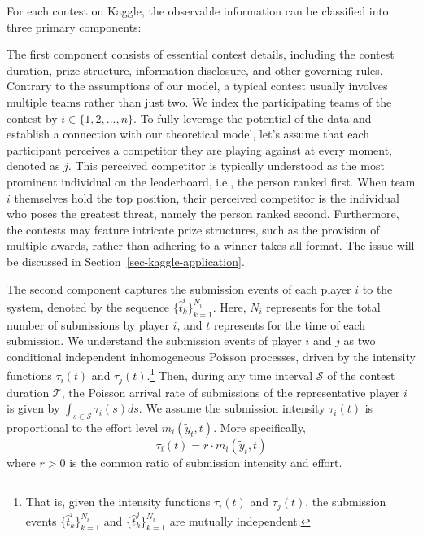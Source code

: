 \documentclass[mnsc]{informs3}
\begin{document}
For each contest on Kaggle, the observable information can be classified into three primary components: 

The first component consists of essential contest details, including the contest duration, prize structure, information disclosure, and other governing rules.
Contrary to the assumptions of our model, a typical contest usually involves multiple teams rather than just two.
We index the participating teams of the contest by $i\in\{1, 2, ..., n\}$. 
To fully leverage the potential of the data and establish a connection with our theoretical model, let's assume that each participant perceives a competitor they are playing against at every moment, denoted as $j$. 
This perceived competitor is typically understood as the most prominent individual on the leaderboard, i.e., the person ranked first.
When team $i$ themselves hold the top position, their perceived competitor is the individual who poses the greatest threat, namely the person ranked second.
Furthermore, the contests may feature intricate prize structures, such as the provision of multiple awards, rather than adhering to a winner-takes-all format.
The issue will be discussed in Section~\ref{sec-kaggle-application}. 

The second component captures the submission events of each player $i$ to the system, denoted by the sequence $\{\hat{t}^i_k\}_{k=1}^{N_i}$.
Here, $N_i$ represents for the total number of submissions by player $i$, and $t$ represents for the time of each submission. 
We understand the submission events of player $i$ and $j$ as two conditional independent inhomogeneous Poisson processes, driven by the intensity functions $\tau_i(t)$ and $\tau_j(t)$.\footnote{That is, given the intensity functions $\tau_i(t)$ and $\tau_j(t)$, the submission events $\{\hat{t}^i_k\}_{k=1}^{N_i}$ and $\{\hat{t}^j_k\}_{k=1}^{N_i}$ are mutually independent.}
Then, during any time interval $\mathcal{S}$ of the contest duration $\mathcal{T}$, the Poisson arrival rate of submissions of the representative player $i$ is given by $\int_{s\in\mathcal{S}}\tau_i(s)ds$. 
We assume the submission intensity $\tau_i(t)$ is proportional to the effort level $m_i(\tilde{y}_t, t)$. More specifically, 
\begin{equation}\label{eq-model-intensity}
\tau_i(t) = r \cdot m_i(\tilde{y}_t, t)
\end{equation}
where $r>0$ is the common ratio of submission intensity and effort. 
\end{document}
